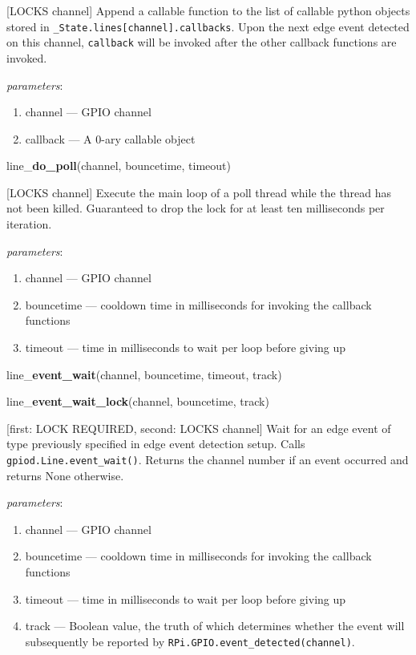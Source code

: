 \documentclass[12pt]{article}
\begin{document}
[LOCKS channel] Append a callable function to the list of callable python objects stored in \texttt{\_State.lines[channel].callbacks}. Upon the next edge event detected on this channel, \texttt{callback} will be invoked after the other callback functions are invoked. 

\textit{parameters}:
\begin{enumerate}      
        \item channel --- GPIO channel
        \item callback --- A 0-ary callable object
\end{enumerate}

\noindent line\_\textbf{do\_poll}(channel, bouncetime, timeout)

[LOCKS channel] Execute the main loop of a poll thread while the thread has not been killed. Guaranteed to drop the lock for at least ten milliseconds per iteration.

\textit{parameters}:
\begin{enumerate}      
        \item channel --- GPIO channel
        \item bouncetime --- cooldown time in milliseconds for invoking the callback functions
        \item timeout --- time in milliseconds to wait per loop before giving up
\end{enumerate}

\noindent line\_\textbf{event\_wait}(channel, bouncetime, timeout, track)

\noindent line\_\textbf{event\_wait\_lock}(channel, bouncetime, track)

[first: LOCK REQUIRED, second: LOCKS channel]
Wait for an edge event of type previously specified in edge event detection setup. Calls \texttt{gpiod.Line.event\_wait()}. Returns the channel number if an event occurred and returns None otherwise. 

\textit{parameters}:
\begin{enumerate}      
        \item channel --- GPIO channel
        \item bouncetime --- cooldown time in milliseconds for invoking the callback functions
        \item timeout --- time in milliseconds to wait per loop before giving up
        \item track --- Boolean value, the truth of which determines whether the event will subsequently be reported by \texttt{RPi.GPIO.event\_detected(channel)}.
\end{enumerate}
\end{document}
